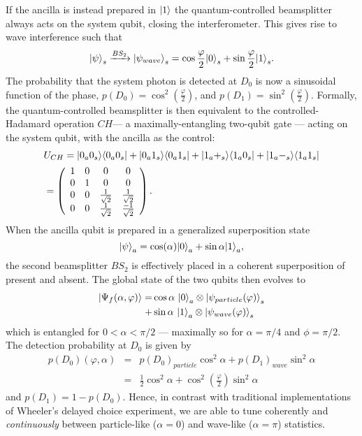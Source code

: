 If the ancilla is instead prepared in $\mbox{$ | 1 \rangle $}$ the quantum-controlled beamsplitter always acts on the system qubit, closing the interferometer. This gives rise to wave interference such that 
\begin{equation}
    \mbox{$ | \psi \rangle $}_s \xrightarrow{BS_2} \mbox{$ | \psi_{wave} \rangle $}_s = \cos\frac{\varphi}{2}\mbox{$ | 0 \rangle $}_s + \sin \frac{\varphi}{2}\mbox{$ | 1 \rangle $}_s.
\label{eqn:system-qubit-wave}
\end{equation}
The probability that the system photon is detected at $D_0$ is now a sinusoidal function of the phase, $p(D_0) = \cos^2\left(\frac{\varphi}{2}\right)$, and $p(D_1) = \sin^2\left(\frac{\varphi}{2}\right)$.  
Formally, the quantum-controlled beamsplitter is then equivalent to the controlled-Hadamard operation $CH$--- a maximally-entangling two-qubit gate --- acting on the system qubit, with the ancilla as the control: 
\begin{eqnarray}
&U_{CH}=\mbox{$ | 0_a0_s \rangle $}\mbox{$ \langle 0_a0_s | $} + \mbox{$ | 0_a1_s \rangle $}\mbox{$ \langle 0_a1_s | $} + 
\mbox{$ | 1_a+_s \rangle $}\mbox{$ \langle 1_a0_s | $} + \mbox{$ | 1_a-_s \rangle $}\mbox{$ \langle 1_a1_s | $} \nonumber \\
&=
 \left(
\begin{array}{cccc}
1 & 0 & 0 & 0 \\
0 & 1 & 0 & 0 \\
0 & 0 & \frac{1}{\sqrt{2}} & \frac{1}{\sqrt{2}} \\
0 & 0 & \frac{1}{\sqrt{2}} & \frac{-1}{\sqrt{2}} 
\end{array}
\right).
\label{eqn:controlled-hadamard}
\end{eqnarray}
When the ancilla qubit is prepared in a generalized superposition state 
\begin{equation}
\mbox{$ | \psi \rangle $}_a=\cos(\alpha)\mbox{$ | 0 \rangle $}_a+\sin{\alpha}\mbox{$ | 1 \rangle $}_a,
\label{eqn:delayed-choice-ancilla}
\end{equation}
the second beamsplitter $BS_2$ is effectively placed in a coherent superposition of present and absent. 
The global state of the two qubits then evolves to 
\begin{equation}
    \begin{split}
    \mbox{$ | \Psi_f(\alpha, \varphi) \rangle $} = 
    &\cos \alpha ~ \mbox{$ | 0 \rangle $}_a \otimes \mbox{$ | \psi_{particle}(\varphi) \rangle $}_s\\
    +&\sin \alpha ~ \mbox{$ | 1 \rangle $}_a \otimes \mbox{$ | \psi_{wave}(\varphi) \rangle $}_s
\end{split}
\end{equation}
which is entangled for $0 < \alpha < \pi/2$ --- maximally so for $\alpha = \pi/4$ and $\phi = \pi/2$.
The detection probability at $D_0$ is given by
\begin{eqnarray}
    p(D_0)(\varphi, \alpha) &=& p(D_0)_{particle} \cos^2\alpha + p(D_1)_{wave} \sin^2\alpha \nonumber \\
&=&  \frac{1}{2} \cos^2\alpha + \cos^2(\frac{\varphi}{2}) \sin^2\alpha
\label{eqn:intensity}
\end{eqnarray}
and $p(D_1) = 1 - p(D_0)$.  Hence, in contrast with traditional implementations of Wheeler's delayed choice experiment, we are able to tune coherently and \emph{continuously} between particle-like ($\alpha=0$) and wave-like ($\alpha=\pi$) statistics. 


